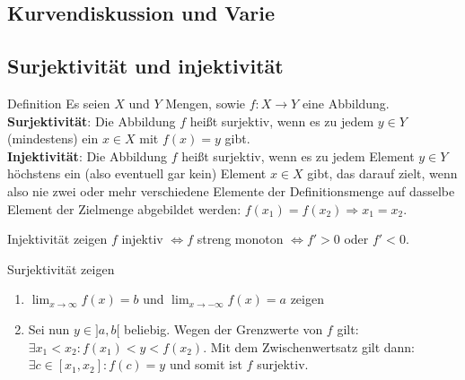 \documentclass[a4paper,8pt]{extarticle}
\begin{document}
\subsection{Kurvendiskussion und Varie}
\subsection{Surjektivität und injektivität}
\begin{mainbox}{Definition}
  Es seien $X$ und $Y$ Mengen, sowie $f: X \rightarrow Y$ eine Abbildung.\\
  \textbf{Surjektivität}: Die Abbildung $f$ heißt surjektiv, wenn es zu jedem  $y \in Y$ (mindestens) ein  $x \in X$ mit $f(x)=y$ gibt. \\
  \textbf{Injektivität}: Die Abbildung $f$ heißt surjektiv, wenn es zu jedem Element $y \in Y$ höchstens ein (also eventuell gar kein) Element $x \in X$ gibt, das darauf zielt, wenn also nie zwei oder mehr verschiedene Elemente der Definitionsmenge auf dasselbe Element der Zielmenge abgebildet werden: $f(x_1)=f(x_2) \Rightarrow x_1=x_2$.
\end{mainbox}

\begin{subbox}{Injektivität zeigen}
  $f$ injektiv $\Leftrightarrow f$ streng monoton $\Leftrightarrow f' > 0$ oder $f' < 0$.
\end{subbox}

\begin{subbox}{Surjektivität zeigen}
  \begin{enumerate}
    \item $\lim_{x\to \infty} f(x) = b $ und $\lim_{x\to -\infty} f(x) = a$ zeigen
    \item Sei nun $y \in]a, b[$ beliebig. Wegen der Grenzwerte von $f$ gilt: $\exists x_1 < x_2 : f(x_1) < y < f(x_2)$. Mit dem Zwischenwertsatz gilt dann: $\exists c \in [x_1, x_2] : f(c) = y$ und somit ist $f$ surjektiv.
  \end{enumerate}
\end{subbox}
\end{document}
